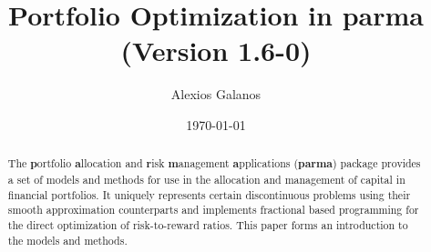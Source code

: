 \documentclass[11pt,a4paper]{article}
\begin{document}
\title{Portfolio Optimization in \textbf{parma}\\
(Version 1.6-0)}
\author{Alexios Galanos}
\date{\today}
\maketitle
\begin{abstract}
The \textbf{p}ortfolio \textbf{a}llocation and \textbf{r}isk \textbf{m}anagement
\textbf{a}pplications (\textbf{parma}) package provides a set of models and
methods for use in the allocation and management of capital in financial portfolios.
It uniquely represents certain discontinuous problems using their smooth approximation
counterparts and implements fractional based programming for the direct optimization
of risk-to-reward ratios. This paper forms an introduction to the models and methods.
\end{abstract}
\clearpage
\newpage

\clearpage

\end{document}
